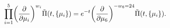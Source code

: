 \begin{equation}
\label{eq:PF3}
\prod_{i=1}^5\biggl({\partial\over\partial\mu_i}\biggr)^{w_i}\tilde{\Pi}(t,\{\mu_i\})
=e^{-t}\biggl({\partial\over\partial\mu_6}\biggr)^{-w_6=24}\tilde{\Pi}(t,\{\mu_i\}).
\end{equation}

